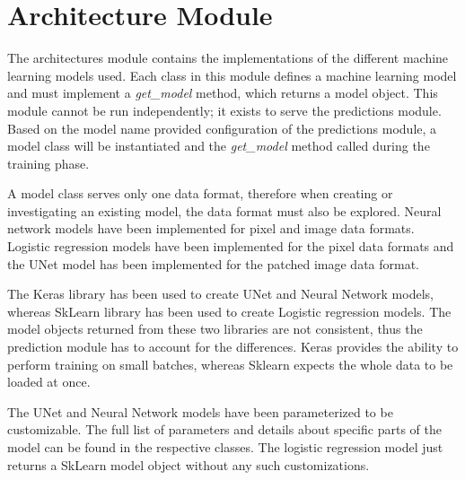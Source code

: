 \section{Architecture Module}

The architectures module contains the implementations of the different machine learning models used. 
Each class in this module defines a machine learning model and must implement a \emph{get\_model} method, which returns a model object. 
This module cannot be run independently; it exists to serve the predictions module. Based on the model name provided configuration
 of the predictions module, a model class will be instantiated and the \emph{get\_model} method called during  the training phase.

A model class serves only one data format, therefore when creating or investigating an existing model, the data format must also
 be explored. Neural network models have been implemented for pixel and image data formats. Logistic regression models have been
  implemented for the pixel data formats and the UNet model has been implemented for the patched image data format.

The Keras library has been used to create UNet and Neural Network models, whereas SkLearn library has been used to create Logistic
 regression models. The model objects returned from these two libraries are not consistent, thus the prediction module has to 
 account for the differences. Keras provides the ability to perform training on small batches, whereas Sklearn expects the whole
  data to be loaded at once.

The UNet and Neural Network models have been parameterized to be customizable. The full list of parameters and details about 
specific parts of the model can be found in the respective classes. The logistic regression model just returns a SkLearn model
 object without any such customizations.
